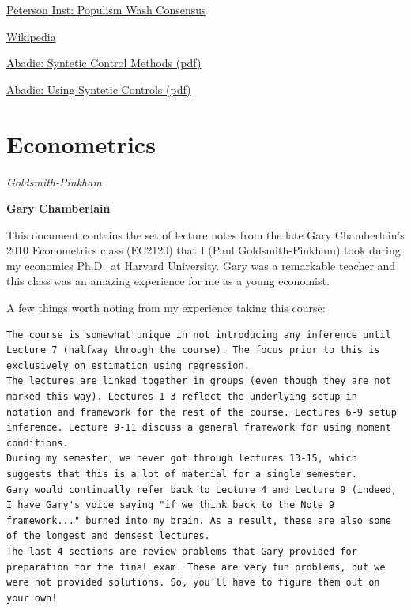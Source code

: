 \documentclass[
]{book}
\begin{document}
\href{https://www.piie.com/blogs/realtime-economic-issues-watch/washington-consensus-stands-test-time-better-populist-policies}{Peterson Inst: Populism Wash Consensus}

\href{https://en.wikipedia.org/wiki/Synthetic_control_method}{Wikipedia}

\href{pdf/Abadie_Synthetic_Control_Methods.pdf}{Abadie: Syntetic Control Methods (pdf)}

\href{pdf/Abadie_Using_Synthetic_Controls.pdf}{Abadie: Using Syntetic Controls (pdf)}

\hypertarget{econometrics}{%
\chapter{Econometrics}\label{econometrics}}

\emph{Goldsmith-Pinkham}

\textbf{Gary Chamberlain}

This document contains the set of lecture notes from the late Gary Chamberlain's 2010 Econometrics class (EC2120) that I (Paul Goldsmith-Pinkham) took during my economics Ph.D.~at Harvard University. Gary was a remarkable teacher and this class was an amazing experience for me as a young economist.

A few things worth noting from my experience taking this course:

\begin{verbatim}
The course is somewhat unique in not introducing any inference until Lecture 7 (halfway through the course). The focus prior to this is exclusively on estimation using regression.
The lectures are linked together in groups (even though they are not marked this way). Lectures 1-3 reflect the underlying setup in notation and framework for the rest of the course. Lectures 6-9 setup inference. Lecture 9-11 discuss a general framework for using moment conditions.
During my semester, we never got through lectures 13-15, which suggests that this is a lot of material for a single semester.
Gary would continually refer back to Lecture 4 and Lecture 9 (indeed, I have Gary's voice saying "if we think back to the Note 9 framework..." burned into my brain. As a result, these are also some of the longest and densest lectures.
The last 4 sections are review problems that Gary provided for preparation for the final exam. These are very fun problems, but we were not provided solutions. So, you'll have to figure them out on your own!
\end{verbatim}
\end{document}
